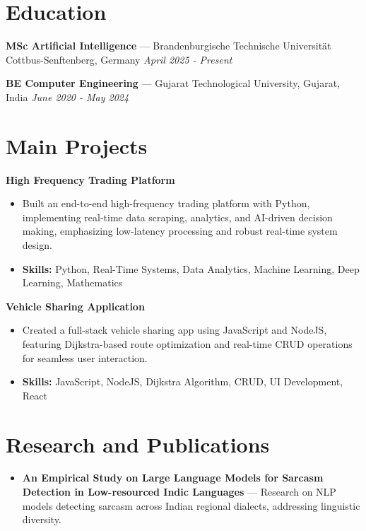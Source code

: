 \documentclass[a4paper,10pt]{article}
\begin{document}
\section*{Education}
\textbf{MSc Artificial Intelligence} — Brandenburgische Technische Universität Cottbus-Senftenberg, Germany \hfill \textit{April 2025 - Present}\par
\vspace{1.5pt}
\textbf{BE Computer Engineering} — Gujarat Technological University, Gujarat, India \hfill \textit{June 2020 - May 2024}\par

\section*{Main Projects}
\textbf{High Frequency Trading Platform}\par
\vspace{1pt}
\begin{itemize}
  \item Built an end-to-end high-frequency trading platform with Python, implementing real-time data scraping, analytics, and AI-driven decision making, emphasizing low-latency processing and robust real-time system design.
  \item \textbf{Skills:} Python, Real-Time Systems, Data Analytics, Machine Learning, Deep Learning, Mathematics
\end{itemize}
\vspace{3pt}
\textbf{Vehicle Sharing Application}\par
\vspace{1pt}
\begin{itemize}
  \item Created a full-stack vehicle sharing app using JavaScript and NodeJS, featuring Dijkstra-based route optimization and real-time CRUD operations for seamless user interaction.
  \item \textbf{Skills:} JavaScript, NodeJS, Dijkstra Algorithm, CRUD, UI Development, React
\end{itemize}

\section*{Research and Publications}
\begin{itemize}
\item \textbf{An Empirical Study on Large Language Models for Sarcasm Detection in Low-resourced Indic Languages} — Research on NLP models detecting sarcasm across Indian regional dialects, addressing linguistic diversity.
\end{itemize}
\end{document}
